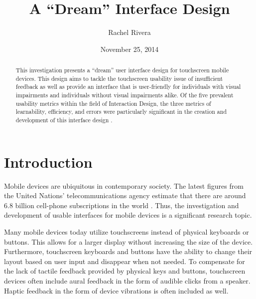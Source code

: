 \documentclass[11pt]{article}
\title{A ``Dream'' Interface Design}
\author{Rachel Rivera}
\date{November 25, 2014}
\begin{document}
\maketitle


\begin{abstract}
This investigation presents a ``dream'' user interface design for touchscreen mobile devices. This design aims to tackle the touchscreen usability issue of insufficient feedback as well as provide an interface that is user-friendly for individuals with visual impairments and individuals without visual impairments alike. Of the five prevalent usability metrics within the field of Interaction Design, the three metrics of learnability, efficiency, and errors were particularly significant in the creation and development of this interface design \cite{Nielsen:1993:UE:529793}.
\end{abstract}


\pagebreak
\tableofcontents



\pagebreak


\section{Introduction}
\label{Introduction}

Mobile devices are ubiquitous in contemporary society. The latest figures from the United Nations' telecommunications agency estimate that there are around 6.8 billion cell-phone subscriptions in the world \cite{UNTelecommunications	}. Thus, the investigation and development of usable interfaces for mobile devices is a significant research topic.

Many mobile devices today utilize touchscreens instead of physical keyboards or buttons. This allows for a larger display without increasing the size of the device. Furthermore, touchscreen keyboards and buttons have the ability to change their layout based on user input and disappear when not needed. To compensate for the lack of tactile feedback provided by physical keys and buttons, touchscreen devices often include aural feedback in the form of audible clicks from a speaker. Haptic feedback in the form of device vibrations is often included as well.
\end{document}
